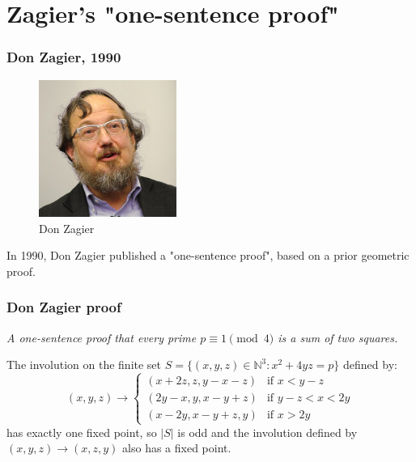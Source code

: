 \documentclass{beamer}
\begin{document}
\section{Zagier's "one-sentence proof"}

\begin{frame}
        \frametitle{Don Zagier, 1990}
        \begin{figure}
                \includegraphics[width=0.4\textwidth]{480px-DonZagier-talking.jpeg}
                \caption*{Don Zagier}
                \label{fig:zagier1}
        \end{figure}

	In 1990, Don Zagier published a "one-sentence proof", based on a prior geometric proof.
\end{frame}

\begin{frame}
	\frametitle{Don Zagier proof}
	
	{\em A one-sentence proof that every prime $p\equiv 1 \pmod{4}$ is a sum of two squares.}

	The involution on the finite set $S = \{(x,y,z) \in \mathbb{N}^3:x^2+4yz = p \}$
	defined by:
	\begin{equation*}
		(x,y,z) \rightarrow
		\begin{cases}
			(x + 2z, z, y - x - z) & \text{if } x < y-z \\
			(2y - x, y, x - y + z) & \text{if } y - z < x < 2y \\
			(x - 2y, x - y + z, y) & \text{if } x > 2y
		\end{cases}
	\end{equation*}
	has exactly one fixed point, so $|S|$ is odd and the involution defined by 
	$(x,y,z) \rightarrow(x,z,y)$ also has a fixed point.

\end{frame}
\end{document}
